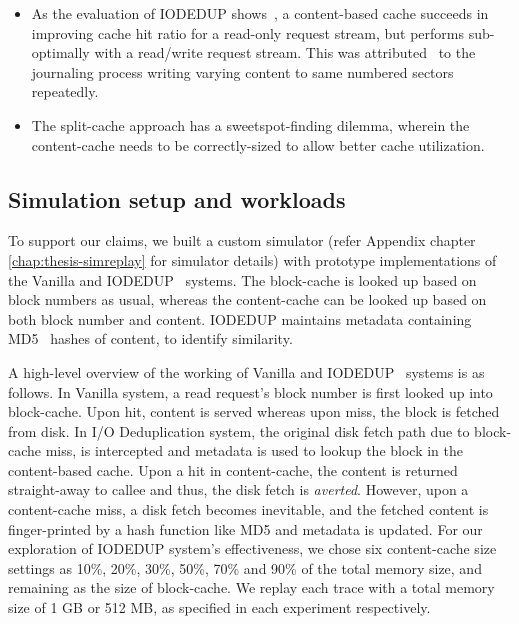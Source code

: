 \begin{itemize}
    \item As the evaluation of IODEDUP shows~\cite{iodedup}, a content-based cache
        succeeds in improving cache hit ratio for a read-only request
        stream, but performs sub-optimally with a read/write request stream.
        This was attributed~\cite{iodedup} to the journaling process writing varying
        content to same numbered sectors repeatedly.
    \item The split-cache approach has a sweetspot-finding dilemma, wherein
        the content-cache needs to be correctly-sized to allow better cache
        utilization.
\end{itemize}

\subsection{Simulation setup and workloads}
To support our claims, we built a custom simulator 
(refer Appendix chapter \ref{chap:thesis-simreplay} for 
simulator details) with prototype implementations of the Vanilla and 
IODEDUP~\cite{iodedup} systems.
The block-cache is looked up 
based on block numbers as usual, whereas
the content-cache can be looked up based on both block number
and content.
IODEDUP maintains metadata containing MD5~\cite{md5}
hashes of content, to identify similarity.

A high-level overview of the working of Vanilla and IODEDUP~\cite{iodedup}
systems is as follows.
In Vanilla system, a read request's block number is first looked up
into block-cache. Upon hit, content is served whereas upon miss,
the block is fetched from disk. In I/O Deduplication system, the
original disk fetch path due to block-cache miss, is
intercepted and metadata is used to lookup the block in
the content-based cache.
Upon a hit in content-cache, the content is returned straight-away to callee
and thus, the disk fetch is \textit{averted}.
However, upon a content-cache miss, a
disk fetch becomes inevitable, and the fetched content is finger-printed
by a hash function like MD5 and metadata is updated.
For our exploration of IODEDUP system's effectiveness,
we chose six content-cache size settings as 10\%,
20\%, 30\%, 50\%, 70\% and 90\% of the total memory size, and
remaining as the size of block-cache. We replay each trace
with a total memory size of 1 GB or 512 MB, as specified in each
experiment respectively.

